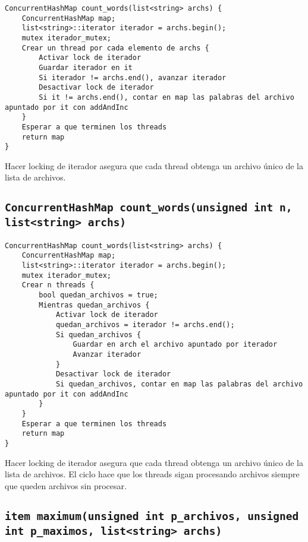 \begin{verbatim}
ConcurrentHashMap count_words(list<string> archs) {
	ConcurrentHashMap map;
	list<string>::iterator iterador = archs.begin();
	mutex iterador_mutex;
	Crear un thread por cada elemento de archs {
		Activar lock de iterador
		Guardar iterador en it
		Si iterador != archs.end(), avanzar iterador
		Desactivar lock de iterador
		Si it != archs.end(), contar en map las palabras del archivo apuntado por it con addAndInc
	}
	Esperar a que terminen los threads
	return map
}
\end{verbatim}

Hacer locking de iterador asegura que cada thread obtenga un archivo único de la lista de archivos.


\subsection{\texttt{ConcurrentHashMap count_words(unsigned int n, list<string> archs)}}

\begin{verbatim}
ConcurrentHashMap count_words(list<string> archs) {
	ConcurrentHashMap map;
	list<string>::iterator iterador = archs.begin();
	mutex iterador_mutex;
	Crear n threads {
		bool quedan_archivos = true;
		Mientras quedan_archivos {
			Activar lock de iterador
			quedan_archivos = iterador != archs.end();
			Si quedan_archivos {
				Guardar en arch el archivo apuntado por iterador
				Avanzar iterador
			}
			Desactivar lock de iterador
			Si quedan_archivos, contar en map las palabras del archivo apuntado por it con addAndInc
		}
	}
	Esperar a que terminen los threads
	return map
}
\end{verbatim}

Hacer locking de iterador asegura que cada thread obtenga un archivo único de la lista de archivos. El ciclo hace que los threads sigan procesando archivos siempre que queden archivos sin procesar.


\subsection{\texttt{item maximum(unsigned int p_archivos, unsigned int p_maximos, list<string> archs)}}

